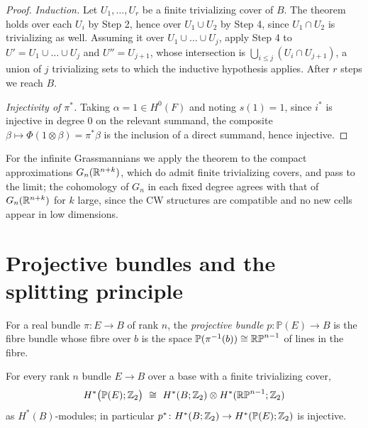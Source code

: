 \begin{proof}
 \emph{Induction.} Let $U_1,\dots,U_r$ be a finite trivializing cover of
$B$. The theorem holds over each $U_i$ by Step 2, hence over
$U_1\cup U_2$ by Step 4, since $U_1\cap U_2$ is trivializing as well. Assuming
it over $U_1\cup\dots\cup U_j$, apply Step 4 to
$U'=U_1\cup\dots\cup U_j$ and $U''=U_{j+1}$, whose intersection is
$\bigcup_{i\le j}(U_i\cap U_{j+1})$, a union of $j$ trivializing sets to which
the inductive hypothesis applies. After $r$ steps we reach $B$.

 \emph{Injectivity of $\pi^*$.} Taking $\alpha=1\in H^0(F)$ and noting
$s(1)=1$, since $i^*$ is injective in degree $0$ on the relevant summand, the
composite $\beta\mapsto\Phi(1\otimes\beta)=\pi^*\beta$ is the inclusion of a
direct summand, hence injective.
\end{proof}

\begin{remark}
For the infinite Grassmannians we apply the theorem to the compact
approximations $G_n(\mathbb{R}^{n+k})$, which do admit finite trivializing covers, and
pass to the limit; the cohomology of $G_n$ in each fixed degree agrees with that
of $G_n(\mathbb{R}^{n+k})$ for $k$ large, since the CW structures are compatible and no
new cells appear in low dimensions.
\end{remark}

\section{Projective bundles and the splitting principle}

\begin{definition}
For a real bundle $\pi\colon E\to B$ of rank $n$, the \emph{projective bundle}
$p\colon\mathbb P(E)\to B$ is the fibre bundle whose fibre over $b$ is the space
$\mathbb P(\pi^{-1}(b))\cong\mathbb{RP}^{n-1}$ of lines in the fibre.
\end{definition}

\begin{lemma}\label{lem:PE-injective}
For every rank $n$ bundle $E\to B$ over a base with a finite trivializing cover,
\[
H^*\big(\mathbb P(E);\Z_2\big)\ \iso\ H^*(B;\Z_2)\otimes H^*(\RP^{n-1};\Z_2)
\]
as $H^*(B)$-modules; in particular
$p^*\colon H^*(B;\mathbb{Z}_2)\to H^*(\mathbb P(E);\mathbb{Z}_2)$ is injective.
\end{lemma}

